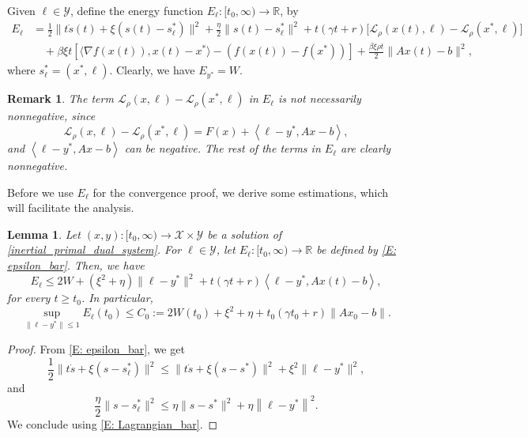 \documentclass[pdflatex,sn-mathphys-num]{sn-jnl}
\theoremstyle{thmstyleone}
\newtheorem{lemma}[theorem]{Lemma}
\theoremstyle{thmstyletwo}
\newtheorem{remark}[theorem]{Remark}
\theoremstyle{thmstylethree}
\newcommand{\R}{\mathbb{R}}
\newcommand{\X}{\mathcal{X}}
\newcommand{\Y}{\mathcal{Y}}
\begin{document}
Given $\ell\in\Y$, define the energy function $E_\ell:[t_0,\infty)\to\R$, by
\begin{equation}\label{E: epsilon_bar}
\begin{aligned}
E_\ell
&= \frac{1}{2}\| t\dot{s}(t) + \xi(s(t)-s_\ell^*) \|^2 + \frac{\eta}{2}\| s(t)-s_\ell^* \|^2
  + t(\gamma t + r) \big[ \mathcal{L}_\rho\left(x(t),\ell\right) - \mathcal{L}_\rho(x^*,\ell)\big] \\
&\quad + \beta\xi t \left[ \langle \nabla f(x(t)), x(t)-x^* \rangle - \left( f(x(t)) - f(x^*) \right) \right] 
  + \frac{\beta\xi \rho t}{2}\| Ax(t)-b \|^2,
\end{aligned}
\end{equation}
where $s_\ell^*=(x^*,\ell)$. Clearly, we have $E_{y^*}=W$.

\begin{remark}
The term $\mathcal{L}_\rho\left(x,\ell\right) - \mathcal{L}_\rho(x^*,\ell)$ in $E_\ell$ is not necessarily nonnegative, since 
\begin{equation}\label{E: Lagrangian_bar}
\mathcal{L}_\rho\left(x,\ell\right) - \mathcal{L}_\rho(x^*,\ell) = F(x) 
  + \left\langle \ell - y^*, Ax-b \right\rangle,
\end{equation}
and $\left\langle \ell - y^*, Ax-b \right\rangle$ can be negative. The rest of the terms in $E_\ell$ are clearly nonnegative.
\end{remark}


Before we use $E_\ell$ for the convergence proof, we derive some estimations, which will facilitate the analysis.

\begin{lemma}\label{Lem: epsilon_bar}
Let $(x,y):[t_0,\infty)\to\X\times\Y$ be a solution of \eqref{inertial_primal_dual_system}. For $\ell\in\Y$, let $E_\ell:[t_0,\infty)\to\R$ be defined by \eqref{E: epsilon_bar}. Then, we have
\begin{equation*}
E_\ell \le 2W + (\xi^2 + \eta)\| \ell - y^*\|^2 + t(\gamma t + r)\left\langle \ell - y^*, Ax(t)-b \right\rangle,
\end{equation*}
for every $t\ge t_0$. In particular,
$$\sup_{\|\ell-y^*\|\le 1} E_\ell(t_0) \le C_0:=2W(t_0) + \xi^2 + \eta + t_0(\gamma t_0 + r) \| Ax_0-b \|.$$
\end{lemma}


\begin{proof}
From \eqref{E: epsilon_bar}, we get
$$\frac{1}{2}\| t\dot{s} + \xi(s-s_\ell^*) \|^2
\le \| t\dot{s} + \xi(s-s^*) \|^2 + \xi^2\| \ell - y^*\|^2,$$
and
$$ \frac{\eta}{2}\| s-s_\ell^* \|^2 
\le \eta\| s-s^* \|^2 + \eta \left\| \ell - y^* \right\|^2. $$
We conclude using \eqref{E: Lagrangian_bar}.
\end{proof}
\end{document}
